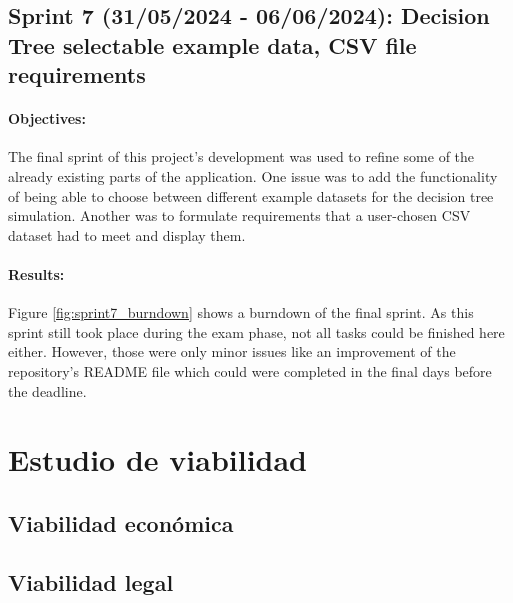 \subsection{Sprint 7 (31/05/2024 - 06/06/2024): Decision Tree selectable example data, CSV file requirements}
\paragraph{Objectives:}
The final sprint of this project's development was used to refine some of the already existing parts of the application. One issue was to add the functionality of being able to choose between different example datasets for the decision tree simulation. Another was to formulate requirements that a user-chosen CSV dataset had to meet and display them.

\paragraph{Results:}
Figure \ref{fig:sprint7_burndown} shows a burndown of the final sprint. As this sprint still took place during the exam phase, not all tasks could be finished here either.  However, those were only minor issues like an improvement of the repository's README file which could were completed in the final days before the deadline.

\section{Estudio de viabilidad}

\subsection{Viabilidad económica}

\subsection{Viabilidad legal}